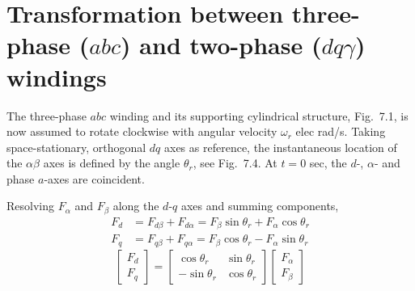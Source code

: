 \documentclass[a4paper,numbers=noenddot,12pt]{scrbook}
\begin{document}
        \section{Transformation between three-phase ($abc$) and two-phase ($d q \gamma$) windings}

        The three-phase $abc$ winding and its supporting cylindrical structure, Fig.\ 7.1, is now assumed to rotate clockwise with angular velocity $\omega_r$ elec rad/s. Taking space-stationary, orthogonal $dq$ axes as reference, the instantaneous location of the $\alpha \beta$ axes is defined by the angle $\theta_r$, see Fig.\ 7.4. At $t = 0$ sec, the $d$-, $\alpha$- and phase $a$-axes are coincident.

        Resolving $F_{\alpha}$ and $F_{\beta}$ along the $d$-$q$ axes and summing components,
        \begin{equation}
            \begin{aligned}
                F_d & = F_{d \beta} + F_{d \alpha} = F_{\beta} \sin \theta_r + F_{\alpha} \cos \theta_r\\
                F_q & = F_{q \beta} + F_{q \alpha} = F_{\beta} \cos \theta_r - F_{\alpha} \sin \theta_r
            \end{aligned}
            \label{eq:Eq7.56}
        \end{equation}
        \begin{equation}
            \begin{bmatrix}
                F_d \\ F_q
            \end{bmatrix}
            =
            \begin{bmatrix}
                \cos \theta_r & \sin \theta_r \\
                -\sin \theta_r & \cos \theta_r
            \end{bmatrix}
            \begin{bmatrix}
                F_{\alpha} \\ F_{\beta}
            \end{bmatrix}
            \label{eq:Eq7.57}
        \end{equation}
\end{document}
